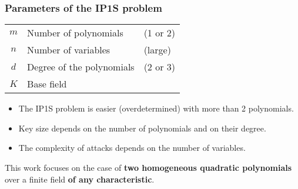\documentclass{beamer}%
\def\strong#1{{\bf\color{rouge}#1}}
\begin{document}
\begin{frame}\frametitle{Parameters of the IP1S problem}%

\hfil\begin{tabular}{cll}\toprule \color{rouge}$m$ & Number of
polynomials & (1 or 2)\\ \color{rouge}$n$ & Number of variables &
(large)\\ \color{rouge}$d$ & Degree of the polynomials & (2 or 3)\\
\color{rouge}$K$ & Base field\\\bottomrule
\end{tabular}

\bigskip
\begin{itemize}
\item The IP1S problem is easier (overdetermined) with more than 2 polynomials.
\item Key size depends on the number of polynomials and on their degree.
\item The complexity of attacks depends on the number of variables.
\end{itemize}

\bigskip
This work focuses on the case of \strong{two homogeneous quadratic
polynomials} over a finite field \strong{of any characteristic}.
\end{frame}%
\end{document}

